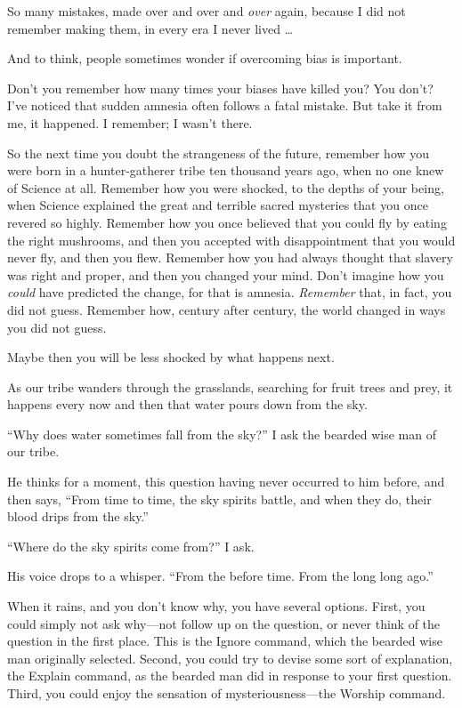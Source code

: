 {
 So many mistakes, made over and over and \textit{over} again,
because I did not remember making them, in every era I never lived
\ldots}

{
 And to think, people sometimes wonder if overcoming bias is
important.}

{
 Don't you remember how many times your biases have
killed you? You don't? I've noticed
that sudden amnesia often follows a fatal mistake. But take it from me,
it happened. I remember; I wasn't there.}

{
 So the next time you doubt the strangeness of the future, remember
how you were born in a hunter-gatherer tribe ten thousand years ago,
when no one knew of Science at all. Remember how you were shocked, to
the depths of your being, when Science explained the great and terrible
sacred mysteries that you once revered so highly. Remember how you once
believed that you could fly by eating the right mushrooms, and then you
accepted with disappointment that you would never fly, and then you
flew. Remember how you had always thought that slavery was right and
proper, and then you changed your mind. Don't imagine
how you \textit{could} have predicted the change, for that is amnesia.
\textit{Remember} that, in fact, you did not guess. Remember how,
century after century, the world changed in ways you did not guess.}

{
 Maybe then you will be less shocked by what happens next.}

\myendsectiontext


\bigskip


{
 As our tribe wanders through the grasslands, searching for fruit
trees and prey, it happens every now and then that water pours down
from the sky. }

{
 ``Why does water sometimes fall from the
sky?'' I ask the bearded wise man of our tribe.}

{
 He thinks for a moment, this question having never occurred to him
before, and then says, ``From time to time, the sky
spirits battle, and when they do, their blood drips from the
sky.''}

{
 ``Where do the sky spirits come
from?'' I ask.}

{
 His voice drops to a whisper. ``From the before
time. From the long long ago.''}

{
 When it rains, and you don't know why, you have
several options. First, you could simply not ask why---not follow up on
the question, or never think of the question in the first place. This
is the Ignore command, which the bearded wise man originally selected.
Second, you could try to devise some sort of explanation, the Explain
command, as the bearded man did in response to your first question.
Third, you could enjoy the sensation of mysteriousness---the Worship
command.}

